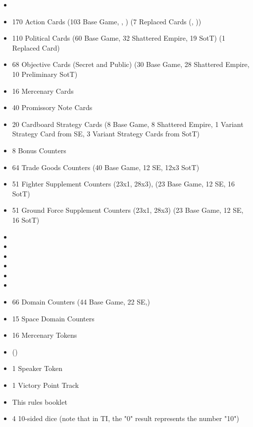 \documentclass[11pt,fleqn]{book} %
\begin{document}
\begin{itemize}
\item {}
\item 170 Action Cards (103 Base Game, , ) (7 Replaced Cards (, ))
\item 110 Political Cards (60 Base Game, 32 Shattered Empire, 19 SotT) (1 Replaced Card)
\item 68 Objective Cards (Secret and Public) (30 Base Game, 28 Shattered Empire, 10 Preliminary SotT)
\item 16 Mercenary Cards
\item 40 Promissory Note Cards
\item 20 Cardboard Strategy Cards (8 Base Game, 8 Shattered Empire, 1 Variant Strategy Card from SE, 3 Variant Strategy Cards from SotT)
\item 8 Bonus Counters
\item 64 Trade Goods Counters (40 Base Game, 12 SE, 12x3 SotT)
\item 51 Fighter Supplement Counters (23x1, 28x3), (23 Base Game, 12 SE, 16 SotT)
\item 51 Ground Force Supplement Counters (23x1, 28x3) (23 Base Game, 12 SE, 16 SotT)
\item {}
\item {}
\item {}
\item {}
\item {}
\item {}
\item 66 Domain Counters (44 Base Game, 22 SE,)
\item 15 Space Domain Counters
\item 16 Mercenary Tokens
\item {} ()
\item 1 Speaker Token
\item 1 Victory Point Track
\item This rules booklet
\item 4 10-sided dice (note that in TI, the "0" result represents the number "10")
\end{itemize}
\end{document}
